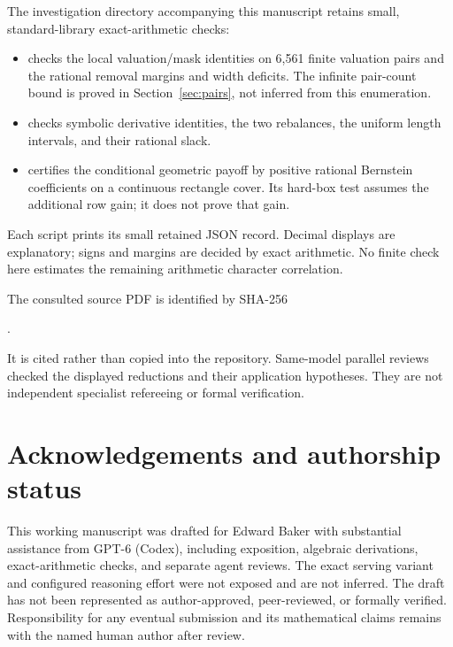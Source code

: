 \documentclass[11pt]{article}
\theoremstyle{definition}
\theoremstyle{remark}
\numberwithin{equation}{section}
\begin{document}
The investigation directory accompanying this manuscript retains
small, standard-library exact-arithmetic checks:
\begin{itemize}
\item {} checks the local
valuation/mask identities on 6,561 finite valuation pairs and the
rational removal margins and width deficits. The infinite pair-count
bound is proved in Section~\ref{sec:pairs}, not inferred from this
enumeration.
\item {} checks symbolic
derivative identities, the two rebalances, the uniform length
intervals, and their rational slack.
\item {} certifies the
conditional geometric payoff by positive rational Bernstein
coefficients on a continuous rectangle cover. Its hard-box test
assumes the additional row gain; it does not prove that gain.
\end{itemize}
Each script prints its small retained JSON record. Decimal displays
are explanatory; signs and margins are decided by exact arithmetic.
No finite check here estimates the remaining arithmetic character
correlation.

The consulted source PDF is identified by SHA-256
\begin{center}\small
{}.
\end{center}
It is cited rather than copied into the repository. Same-model
parallel reviews checked the displayed reductions and their
application hypotheses. They are not independent specialist
refereeing or formal verification.

\section*{Acknowledgements and authorship status}
This working manuscript was drafted for Edward Baker with substantial
assistance from GPT-6 (Codex), including exposition, algebraic
derivations, exact-arithmetic checks, and separate agent reviews.
The exact serving variant and configured reasoning effort were not
exposed and are not inferred. The draft has not been represented as
author-approved, peer-reviewed, or formally verified. Responsibility
for any eventual submission and its mathematical claims remains with
the named human author after review.
\end{document}
